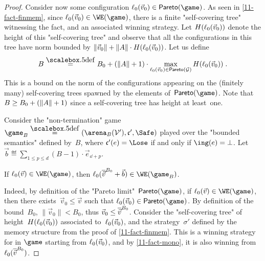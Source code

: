 \begin{proof}

  Consider now some configuration $\loc_0(\vec
  v_0)\in\mathsf{Pareto}(\game)$.  As seen in \cref{11-fact-finmem},
  since $\loc_0(\vec v_0)\in\WE(\game)$, there is a finite
  "self-covering tree" witnessing the fact, and an associated winning
  strategy.  Let $H(\loc_0(\vec v_0))$ denote the height of this
  "self-covering tree" and observe that all the configurations in this
  tree have norm bounded by $\|\vec v_0\|+\|\Act\|\cdot H(\loc_0(\vec
  v_0))$.
  Let us define
  \begin{equation}\label{11-b}
   B\eqdef B_0+(\|\Act\|+1)\cdot \max_{\loc_0(\vec
  v_0)\in\mathsf{Pareto}(\?G)}H(\loc_0(\vec v_0))\;.
  \end{equation}
  This is a bound on the norm of the configurations appearing on the
  (finitely many) self-covering trees spawned by the elements
  of~$\mathsf{Pareto}(\game)$.  Note that $B\geq B_0+(\|\Act\|+1)$ since
  a self-covering tree has height at least~one.

  Consider the "non-termination" game
  $\game_B\eqdef(\bounded(\?V'),\col',\Safe)$ played over the
  "bounded semantics" defined by~$B$, where $\col'(e)=\Lose$ if and
  only if $\ing(e)=\sink$.  Let $\vec b\eqdef\sum_{1\leq p\leq
  d}(B-1)\cdot\vec e_{\dd+p}$.
  {\renewcommand{\qedsymbol}{}
  \begin{claim}\label{11-cl-parity2bounding} If $\loc_0(\vec
    v)\in\WE(\game)$, then
    $\loc_0(\capp[B_0]{v}+\vec b)\in\WE(\game_B)$.
  \end{claim}}
  Indeed, by definition of the "Pareto
  limit"~$\mathsf{Pareto}(\game)$, if $\loc_0(\vec v)\in\WE(\game)$,
  then there exists~$\vec v_0\leq\vec v$ such that $\loc_0(\vec
  v_0)\in\mathsf{Pareto}(\game)$.  By definition of the bound~$B_0$,
  $\|\vec v_0\|<B_0$, thus $\vec v_0\leq\capp[B_0]v$.  Consider the
  "self-covering tree" of height~$H(\loc_0(\vec v_0))$ associated
  to~$\loc_0(\vec v_0)$, and the strategy~$\sigma'$ defined by the
  memory structure from the
  proof of \cref{11-fact-finmem}.  This is a winning strategy for \Eve
  in $\game$ starting from $\loc_0(\vec v_0)$, and
  by \cref{11-fact-mono}, it is also winning
  from~$\loc_0(\capp[B_0]v)$.
    

\end{proof}
